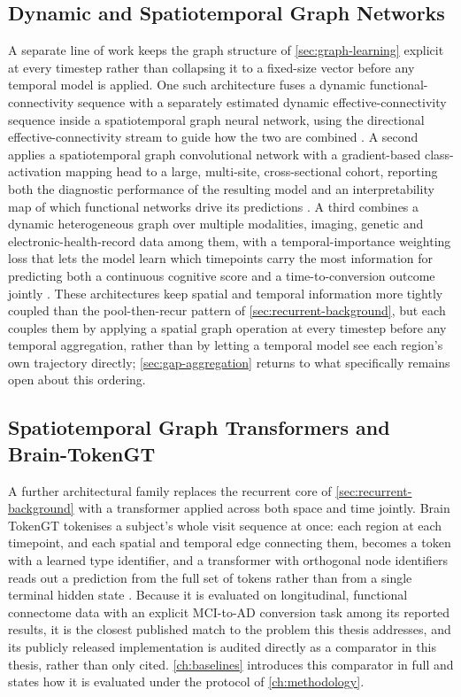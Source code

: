 \subsection{Dynamic and Spatiotemporal Graph Networks}\label{sec:dynamic-graph-background}

A separate line of work keeps the graph structure of \autoref{sec:graph-learning}
explicit at every timestep rather than collapsing it to a fixed-size vector before any
temporal model is applied. One such architecture fuses a dynamic functional-connectivity
sequence with a separately estimated dynamic effective-connectivity sequence inside a
spatiotemporal graph neural network, using the directional effective-connectivity stream to
guide how the two are combined \parencite{chen2024knosys}. A second applies a
spatiotemporal graph convolutional network with a gradient-based class-activation mapping
head to a large, multi-site, cross-sectional cohort, reporting both the diagnostic
performance of the resulting model and an interpretability map of which functional networks
drive its predictions \parencite{zhang2024stgcgcam}. A third combines a dynamic
heterogeneous graph over multiple modalities, imaging, genetic and electronic-health-record
data among them, with a temporal-importance weighting loss that lets the model learn which
timepoints carry the most information for predicting both a continuous cognitive score and
a time-to-conversion outcome jointly \parencite{hassan2025magnetad}. These architectures
keep spatial and temporal information more tightly coupled than the pool-then-recur pattern
of \autoref{sec:recurrent-background}, but each couples them by applying a spatial graph
operation at every timestep before any temporal aggregation, rather than by letting a
temporal model see each region's own trajectory directly; \autoref{sec:gap-aggregation}
returns to what specifically remains open about this ordering.

\subsection{Spatiotemporal Graph Transformers and Brain-TokenGT}\label{sec:spatiotemporal-transformers-background}

A further architectural family replaces the recurrent core of
\autoref{sec:recurrent-background} with a transformer applied across both space and time
jointly. Brain TokenGT tokenises a subject's whole visit sequence at once: each region at
each timepoint, and each spatial and temporal edge connecting them, becomes a token with a
learned type identifier, and a transformer with orthogonal node identifiers reads out a
prediction from the full set of tokens rather than from a single terminal hidden state
\parencite{dong2023braintokengt}. Because it is evaluated on longitudinal, functional
connectome data with an explicit \ac{MCI}-to-\ac{AD} conversion task among its reported
results, it is the closest published match to the problem this thesis addresses, and its
publicly released implementation is audited directly as a comparator in this thesis, rather
than only cited. \autoref{ch:baselines} introduces this comparator in full and states how it
is evaluated under the protocol of \autoref{ch:methodology}.

